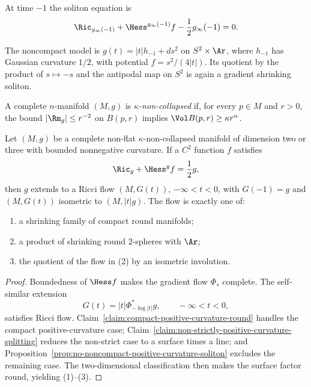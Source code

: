 At time $-1$ the soliton equation is
\begin{equation}\label{GSS-1}
 \Ric_{g_\infty(-1)}+\Hess^{g_\infty(-1)}f
 -\frac12g_\infty(-1)=0.
\end{equation}

The noncompact model is
$g(t)=|t|h_{-1}+ds^2$ on $S^2\times\Ar$, where $h_{-1}$ has
Gaussian curvature $1/2$, with potential $f=s^2/(4|t|)$. Its
quotient by the product of $s\mapsto-s$ and the antipodal map on
$S^2$ is again a gradient shrinking soliton.

\begin{definition}\label{def:kappa-noncollapsed-riemannian-manifold}
A complete $n$-manifold $(M,g)$ is \emph{$\kappa$-non-collapsed}
if, for every $p\in M$ and $r>0$, the bound
$|\Rm_g|\leq r^{-2}$ on $B(p,r)$ implies
$\Vol B(p,r)\geq\kappa r^n$.
\end{definition}

\begin{theorem}\label{thm:gradient-shrinking-soliton-classification}
\label{GSSclass}
Let $(M,g)$ be a complete non-flat $\kappa$-non-collapsed manifold
of dimension two or three with bounded nonnegative curvature. If a
$C^2$ function $f$ satisfies
\[
 \Ric_g+\Hess^g f=\frac12g,
\]
then $g$ extends to a Ricci flow $(M,G(t))$, $-\infty<t<0$, with
$G(-1)=g$ and $(M,G(t))$ isometric to $(M,|t|g)$. The flow is exactly
one of:
\begin{enumerate}
\item[(1)] a shrinking family of compact round manifolds;
\item[(2)] a product of shrinking round $2$-spheres with $\Ar$;
\item[(3)] the quotient of the flow in (2) by an isometric involution.
\end{enumerate}
\end{theorem}
\begin{proof}
\sketch Boundedness of $\Hess f$ makes the gradient flow $\Phi_s$
complete. The self-similar extension
\begin{equation}\label{Gdefn}
 G(t)=|t|\Phi_{-\log|t|}^*g,\qquad -\infty<t<0,
\end{equation}
satisfies Ricci flow. Claim~\ref{claim:compact-positive-curvature-round}
handles the compact positive-curvature case;
Claim~\ref{claim:non-strictly-positive-curvature-splitting} reduces
the non-strict case to a surface times a line; and
Proposition~\ref{prop:no-noncompact-positive-curvature-soliton}
excludes the remaining case. The two-dimensional classification
then makes the surface factor round, yielding (1)--(3).
\end{proof}

